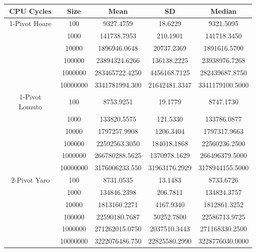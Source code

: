 \documentclass{article}
\begin{document}
\begin{center}
    \small
    \begin{tabular}{ |c c | c c c| }
        \hline
        CPU Cycles      & Size     & Mean           & SD            & Median \\
        \hline
        1-Pivot Hoare   & 100      & 9327.4759      & 18.6229       & 9321.5095 \\
                        & 1000     & 141738.7953    & 210.1901      & 141718.3450 \\
                        & 10000    & 1896946.0648   & 20737.2369    & 1891616.5700 \\
                        & 100000   & 23894324.6266  & 136138.2225   & 23938976.7268 \\
                        & 1000000  & 283465722.4250 & 4456168.7125  & 282439687.8750 \\
                        & 10000000 & 3341781994.300 & 21642481.3347 & 3341179100.5000 \\
        \hline
        1-Pivot Lomuto  & 100      & 8753.9251      & 19.1779       & 8747.1730 \\
                        & 1000     & 133820.5575    & 121.5330      & 133786.0877 \\
                        & 10000    & 1797257.9908   & 1206.3404     & 1797317.9663 \\
                        & 100000   & 22592563.3050  & 184018.1868   & 22560236.2500 \\
                        & 1000000  & 266780288.5625 & 1370978.1629  & 266496379.5000 \\
                        & 10000000 & 3176006233.550 & 31963176.2929 & 3178944155.5000 \\
        \hline
        2-Pivot Yaro    & 100      & 8731.0535      & 13.1483       & 8733.6726 \\
                        & 1000     & 134846.2398    & 206.7811      & 134824.3757 \\
                        & 10000    & 1813160.2271   & 4167.9340     & 1812861.3252 \\
                        & 100000   & 22590180.7687  & 50252.7800    & 22586713.9725 \\
                        & 1000000  & 271262015.0750 & 2037510.3443  & 271168330.2500 \\
                        & 10000000 & 3222076486.750 & 22825580.2990 & 3228776030.0000 \\
        \hline

\end{tabular}
\end{center}
\end{document}
